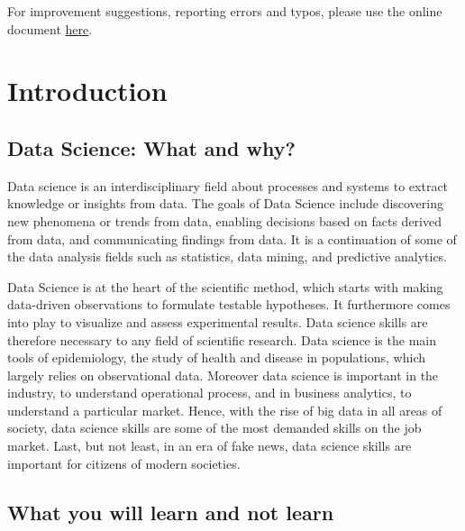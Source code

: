 \documentclass[
]{krantz}
\begin{document}
For improvement suggestions, reporting errors and typos, please use the online document \href{https://docs.google.com/document/d/1tdWmtkDaNUnQLkG_cNfJ2KLHwnaldtQwZh6pUQh8Mpc/edit?usp=sharing}{here}.

\hypertarget{introduction}{%
\section*{Introduction}\label{introduction}}

\hypertarget{data-science-what-and-why}{%
\subsection*{Data Science: What and why?}\label{data-science-what-and-why}}

Data science is an interdisciplinary field about processes and systems to extract knowledge or insights from data.
The goals of Data Science include discovering new phenomena or trends from data, enabling decisions based on facts derived from data, and communicating findings from data. It is a continuation of some of the data analysis fields such as statistics, data mining, and predictive analytics.

Data Science is at the heart of the scientific method, which starts with making data-driven observations to formulate testable hypotheses. It furthermore comes into play to visualize and assess experimental results. Data science skills are therefore necessary to any field of scientific research. Data science is the main tools of epidemiology, the study of health and disease in populations, which largely relies on observational data. Moreover data science is important in the industry, to understand operational process, and in business analytics, to understand a particular market. Hence, with the rise of big data in all areas of society, data science skills are some of the most demanded skills on the job market. Last, but not least, in an era of fake news, data science skills are important for citizens of modern societies.

\hypertarget{what-you-will-learn-and-not-learn}{%
\subsection*{What you will learn and not learn}\label{what-you-will-learn-and-not-learn}}
\end{document}

